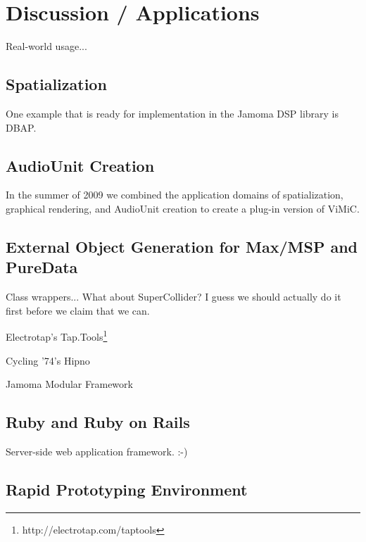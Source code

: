 \documentclass[twoside,10pt]{article}
\begin{document}
\section{Discussion / Applications} %

Real-world usage...

\subsection{Spatialization}


One example that is ready for implementation in the Jamoma DSP library is DBAP\cite{Lossius:2009}.


\subsection{AudioUnit Creation}

In the summer of 2009 we combined the application domains of spatialization, graphical rendering, and AudioUnit creation to create a plug-in version of ViMiC\cite{Peters:2008b}.



\subsection{External Object Generation for Max/MSP and PureData}

Class wrappers...  What about SuperCollider?  I guess we should actually do it first before we claim that we can.

Electrotap's Tap.Tools\footnote{http://electrotap.com/taptools}

Cycling '74's Hipno\cite{Place:2005}

Jamoma Modular Framework\cite{Place:2006}


\subsection{Ruby and Ruby on Rails}

Server-side web application framework.  :-)

\subsection{Rapid Prototyping Environment}
\end{document}
